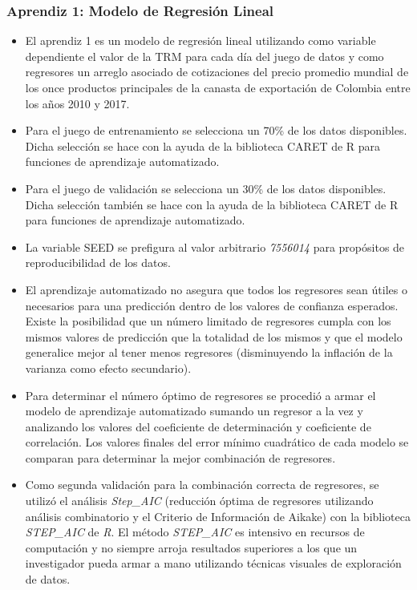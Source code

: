 \subsubsection{Aprendiz 1: Modelo de Regresión Lineal}
\begin{itemize}
	\item El aprendiz 1 es un modelo de regresión lineal utilizando como variable dependiente el valor de la TRM para cada día del juego de datos y como regresores un arreglo asociado de cotizaciones del precio promedio mundial de los once productos principales de la canasta de exportación de Colombia entre los años 2010 y 2017.
	\item Para el juego de entrenamiento se selecciona un 70\% de los datos disponibles. Dicha selección se hace con la ayuda de la biblioteca CARET de R para funciones de aprendizaje automatizado.
	\item Para el juego de validación se selecciona un 30\% de los datos disponibles. Dicha selección también se hace con la ayuda de la biblioteca CARET de R para funciones de aprendizaje automatizado.
	\item La variable SEED se prefigura al valor arbitrario \emph{7556014} para propósitos de reproducibilidad de los datos.
	\item El aprendizaje automatizado no asegura que todos los regresores sean útiles o necesarios para una predicción dentro de los valores de confianza esperados. Existe la posibilidad que un número limitado de regresores cumpla con los mismos valores de predicción que la totalidad de los mismos y que el modelo generalice mejor al tener menos regresores (disminuyendo la inflación de la varianza como efecto secundario).
	\item Para determinar el número óptimo de regresores se procedió a armar el modelo de aprendizaje automatizado sumando un regresor a la vez y analizando los valores del coeficiente de determinación y coeficiente de correlación. Los valores finales del error mínimo cuadrático de cada modelo se comparan para determinar la mejor combinación de regresores.
	\item Como segunda validación para la combinación correcta de regresores, se utilizó el análisis \emph{Step\_AIC} (reducción óptima de regresores utilizando análisis combinatorio y el Criterio de Información de Aikake) con la biblioteca \emph{STEP\_AIC} de \emph{R}. El método \emph{STEP\_AIC} es intensivo en recursos de computación y no siempre arroja resultados superiores a los que un investigador pueda armar a mano utilizando técnicas visuales de exploración de datos.
\end{itemize}

